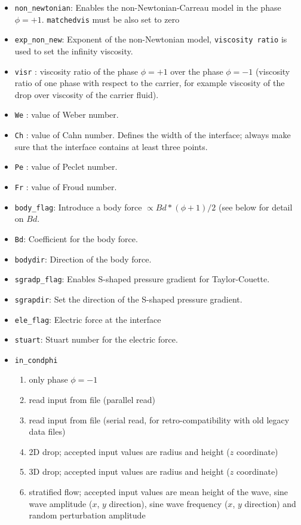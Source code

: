 \begin{itemize}
\item \texttt{non\_newtonian}: Enables the non-Newtonian-Carreau model in the phase $\phi=+1$. \texttt{matchedvis} must be also set to zero
\item \texttt{exp\_non\_new}: Exponent of the non-Newtonian model, \texttt{viscosity ratio} is used to set the infinity viscosity. 
\item \texttt{visr} : viscosity ratio of the phase $\phi=+1$ over the phase $\phi=-1$ (viscosity ratio of one phase with respect to the carrier, for example viscosity of the drop over viscosity of the carrier fluid).
\item \texttt{We} : value of Weber number.
\item \texttt{Ch} : value of Cahn number. Defines the width of the interface; always make sure that the interface contains at least three points.
\item \texttt{Pe} : value of Peclet number.
\item \texttt{Fr} : value of Froud number.
\item \texttt{body\_flag}: Introduce a body force $\propto Bd*(\phi+1)/2$ (see below for detail on $Bd$.
\item \texttt{Bd}: Coefficient for the body force.
\item \texttt{bodydir}: Direction of the body force.
\item \texttt{sgradp\_flag}: Enables S-shaped pressure gradient for Taylor-Couette.
\item \texttt{sgrapdir}: Set the direction of the S-shaped pressure gradient.
\item \texttt{ele\_flag}: Electric force at the interface
\item \texttt{stuart}: Stuart number for the electric force.
\item \texttt{in\_condphi}
\begin{enumerate}
\item only phase $\phi=-1$
\item read input from file (parallel read)
\item read input from file (serial read, for retro-compatibility with old legacy data files)
\item 2D drop; accepted input values are radius and height ($z$ coordinate)
\item 3D drop; accepted input values are radius and height ($z$ coordinate)
\item stratified flow; accepted input values are mean height of the wave, sine wave amplitude ($x$, $y$ direction), sine wave frequency ($x$, $y$ direction) and random perturbation amplitude

\end{enumerate}
\end{itemize}
